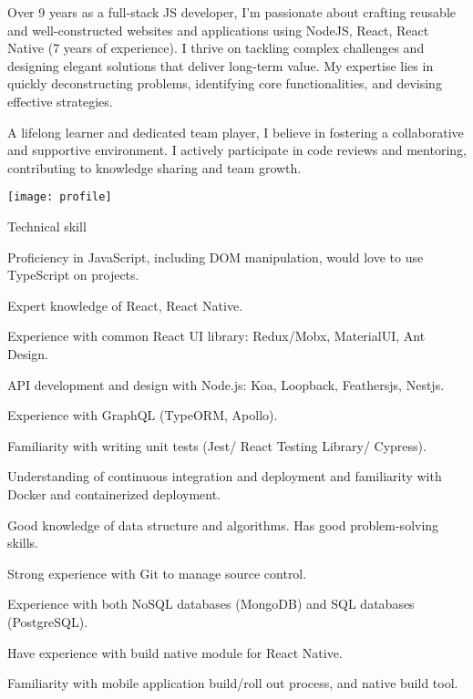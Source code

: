 \documentclass{resume}
\begin{document}

  \noindent\begin{minipage}{0.8\textwidth}%
    Over 9 years as a full-stack JS developer, I'm passionate about crafting reusable and well-constructed websites and applications 
    using NodeJS, React, React Native (7 years of experience). 
    I thrive on tackling complex challenges and designing elegant solutions that deliver long-term value. 
    My expertise lies in quickly deconstructing problems, identifying core functionalities, and devising effective strategies.\newline

    A lifelong learner and dedicated team player, I believe in fostering a collaborative and supportive environment. 
    I actively participate in code reviews and mentoring,  contributing to knowledge sharing and team growth.\newline
    \end{minipage}%
    \hfill%
    \begin{minipage}{0.1\textwidth}\raggedright
      \texttt{[image: profile]}
    \end{minipage}

  \begin{rSection}{Technical skill}
    \begin{rSubsection}{}{}{}{}
      \item Proficiency in JavaScript, including DOM manipulation, would love to use TypeScript on projects.
      \item Expert knowledge of React, React Native.
      \item Experience with common React UI library: Redux/Mobx, MaterialUI, Ant Design.
      \item API development and design with Node.js: Koa, Loopback, Feathersjs, Nestjs.
      \item Experience with GraphQL (TypeORM, Apollo).
      \item Familiarity with writing unit tests (Jest/ React Testing Library/ Cypress).
      \item Understanding of continuous integration and deployment and familiarity with Docker and containerized deployment.
      \item Good knowledge of data structure and algorithms. Has good problem-solving skills.
      \item Strong experience with Git to manage source control.
      \item Experience with both NoSQL databases (MongoDB) and SQL databases (PostgreSQL).
      \item Have experience with build native module for React Native.
      \item Familiarity with mobile application build/roll out process, and native build tool.
    \end{rSubsection}
  \end{rSection}
  
\end{document}
